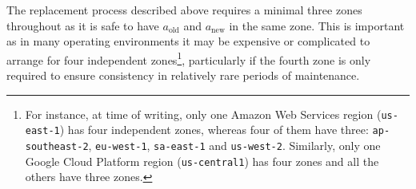 \documentclass[journal]{IEEEtran}
\begin{document}
The replacement process described above requires a minimal three zones
throughout as it is safe to have $a_\mathrm{old}$ and $a_\mathrm{new}$ in the
same zone. This is important as in many operating environments it may be
expensive or complicated to arrange for four independent zones\footnote{For
instance, at time of writing, only one Amazon Web Services region
(\texttt{us-east-1}) has four independent zones, whereas four of them have
three: \texttt{ap-southeast-2}, \texttt{eu-west-1}, \texttt{sa-east-1} and
\texttt{us-west-2}. Similarly, only one Google Cloud Platform region
(\texttt{us-central1}) has four zones and all the others have three zones.},
particularly if the fourth zone is only required to ensure consistency in
relatively rare periods of maintenance.

%
%

\end{document}
